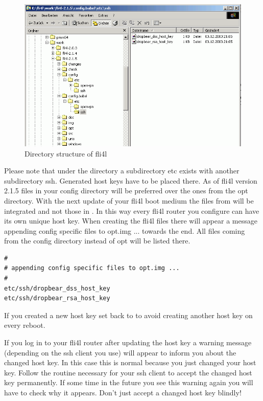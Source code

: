 \begin{description}
  \begin{figure}[htbp]
    \centering
    \includegraphics[width=\columnwidth]{etc_ssh_dir}
    \caption{Directory structure of fli4l}
    \label{fig:etc_ssh_dir}
  \end{figure}

  Please note that under the directory  a subdirectory 
  etc exists with another subdirectory ssh. Generated host keys have to 
  be placed there. As of fli4l version 2.1.5 files in your config directory 
  will be preferred over the ones from the opt directory. With the next 
  update of your fli4l boot medium the files from 
  will be integrated and not those in . In this way every 
  fli4l router you configure can have its own unique host key. When creating 
  the fli4l files there will appear a message \glqq{}appending config specific 
  files to opt.img ...\grqq{} towards the end. All files coming from the 
  config directory instead of opt will be listed there.

\begin{verbatim}
#
# appending config specific files to opt.img ...
#
etc/ssh/dropbear_dss_host_key
etc/ssh/dropbear_rsa_host_key
\end{verbatim}

  If you created a new host key set  back to 
   to avoid creating another host key on every reboot.

  If you log in to your fli4l router after updating the host key a warning 
  message (depending on the ssh client you use) will appear to inform you 
  about the changed host key. In this case this is normal because you just 
  changed your host key. Follow the routine necessary for your ssh client 
  to accept the changed host key permanently. If some time in the future 
  you see this warning again you will have to check why it appears. Don't 
  just accept a changed host key blindly!
  

\end{description}
